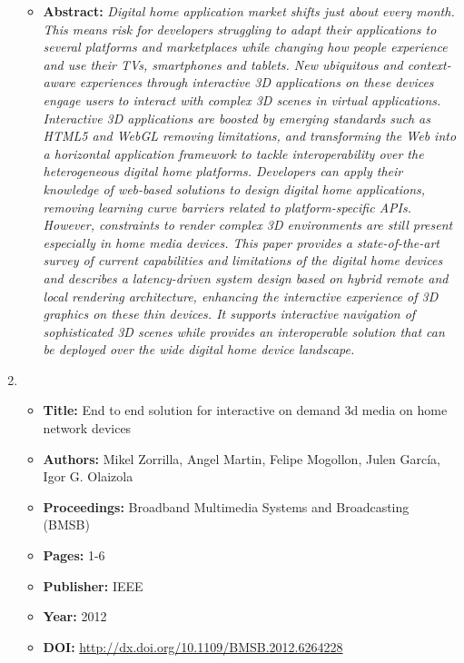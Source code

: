 \begin{enumerate}
\begin{itemize}
	\item \textbf{Abstract:} \textit{Digital home application market shifts just about every month. This means risk for developers struggling to adapt their applications to several platforms and marketplaces while changing how people experience and use their TVs, smartphones and tablets. New ubiquitous and context-aware experiences through interactive 3D applications on these devices engage users to interact with complex 3D scenes in virtual applications. Interactive 3D applications are boosted by emerging standards such as HTML5 and WebGL removing limitations, and transforming the Web into a horizontal application framework to tackle interoperability over the heterogeneous digital home platforms. Developers can apply their knowledge of web-based solutions to design digital home applications, removing learning curve barriers related to platform-specific APIs. However, constraints to render complex 3D environments are still present especially in home media devices. This paper provides a state-of-the-art survey of current capabilities and limitations of the digital home devices and describes a latency-driven system design based on hybrid remote and local rendering architecture, enhancing the interactive experience of 3D graphics on these thin devices. It supports interactive navigation of sophisticated 3D scenes while provides an interoperable solution that can be deployed over the wide digital home device landscape.}
\end{itemize}
\hrulefill
\item 
\begin{itemize} \itemsep1pt\parskip0pt
	\item \textbf{Title:} End to end solution for interactive on demand 3d media on home network devices
	\item \textbf{Authors:} Mikel Zorrilla, Angel Martin, Felipe Mogollon, Julen García, Igor G. Olaizola
	\item \textbf{Proceedings:} Broadband Multimedia Systems and Broadcasting (BMSB)
	\item \textbf{Pages:} 1-6
 	\item \textbf{Publisher:} IEEE
	\item \textbf{Year:} 2012
	\item \textbf{DOI:} \url{http://dx.doi.org/10.1109/BMSB.2012.6264228}

\end{itemize}
\end{enumerate}
